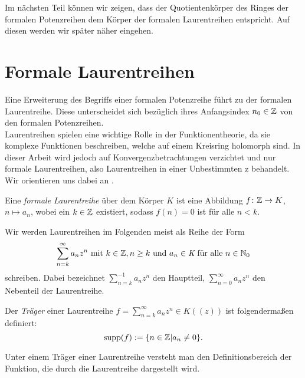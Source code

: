 %
%
%
%
%
%
%
%
%
%
%
%
%
Im nächsten Teil können wir zeigen, dass der Quotientenkörper des Ringes der formalen Potenzreihen dem Körper der formalen Laurentreihen entspricht. Auf diesen werden wir später näher eingehen. 
%
%
%
%
\section{Formale Laurentreihen}
%
Eine Erweiterung des Begriffs einer formalen Potenzreihe führt zu der formalen Laurentreihe. Diese unterscheidet sich bezüglich ihres Anfangsindex $n_0 \in \mathbb{Z}$ von den formalen Potenzreihen. \\
Laurentreihen spielen eine wichtige Rolle in der Funktionentheorie, da sie komplexe Funktionen beschreiben, welche auf einem Kreisring holomorph sind. In dieser Arbeit wird jedoch auf Konvergenzbetrachtungen verzichtet und nur formale Laurentreihen, also Laurentreihen in einer Unbestimmten z behandelt. %
Wir orientieren uns dabei an \cite[S. 563 - 572]{Lueneburg08}.
%
\begin{defn}
Eine \textit{formale Laurentreihe} über dem Körper $K$ ist eine Abbildung $f \colon \mathbb{Z} \rightarrow K$, $n \mapsto a_n$, wobei ein $k\in \mathbb{Z}$ existiert, sodass $f(n) = 0$ ist für alle $n < k$.
\end{defn}
%
%
\begin{nota}
Wir werden Laurentreihen im Folgenden meist als Reihe der Form
\begin{equation*}
\sum_{n= k}^{\infty}a_nz^n \text{ mit } k \in \mathbb{Z}, n \ge k \text{ und }a_n \in\textit{K}\text{ für alle } n\in\mathbb{N}_0 
\end{equation*} 
schreiben.
Dabei bezeichnet $\sum_{n=k}^{-1}a_{n}z^{n}$ den Hauptteil, $\sum_{n=0}^{\infty}a_nz^n$ den Nebenteil der Laurentreihe. 
\end{nota}
%
%
%
%
%
%
%
%
%
%
% 
\begin{defn}\label{traeger}
Der \textit{Träger} einer Laurentreihe $f = \sum_{n =k}^{\infty} a_nz^n \in K((z))$ ist folgendermaßen definiert: 
\[\text{supp}(f) := \lbrace n \in \mathbb{Z} | a_n \neq 0 \rbrace.\] 
\end{defn}
%
%
%
%
\begin{bem}
Unter einem Träger einer Laurentreihe versteht man den Definitionsbereich der Funktion, die durch die Laurentreihe dargestellt wird.
\end{bem}
%
%
%
%
